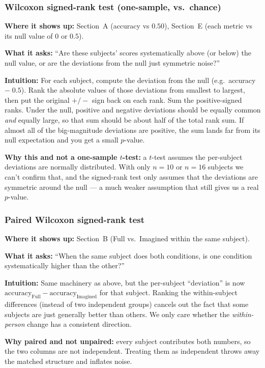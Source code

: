 \documentclass[11pt]{article}
\begin{document}
\subsubsection*{Wilcoxon signed-rank test (one-sample, vs.\ chance)}

\textbf{Where it shows up:} Section~A (accuracy vs $0.50$), Section~E (each metric vs its null value of $0$ or $0.5$).

\textbf{What it asks:} ``Are these subjects' scores systematically above (or below) the null value, or are the deviations from the null just symmetric noise?''

\textbf{Intuition:} For each subject, compute the deviation from the null (e.g.\ accuracy $-\;0.5$). Rank the absolute values of those deviations from smallest to largest, then put the original $+/-$ sign back on each rank. Sum the positive-signed ranks. Under the null, positive and negative deviations should be equally common \emph{and} equally large, so that sum should be about half of the total rank sum. If almost all of the big-magnitude deviations are positive, the sum lands far from its null expectation and you get a small $p$-value.

\textbf{Why this and not a one-sample $t$-test:} a $t$-test assumes the per-subject deviations are normally distributed. With only $n = 10$ or $n = 16$ subjects we can't confirm that, and the signed-rank test only assumes that the deviations are symmetric around the null --- a much weaker assumption that still gives us a real $p$-value.

\subsubsection*{Paired Wilcoxon signed-rank test}

\textbf{Where it shows up:} Section~B (Full vs.\ Imagined within the same subject).

\textbf{What it asks:} ``When the same subject does both conditions, is one condition systematically higher than the other?''

\textbf{Intuition:} Same machinery as above, but the per-subject ``deviation'' is now $\text{accuracy}_{\text{Full}} - \text{accuracy}_{\text{Imagined}}$ for that subject. Ranking the within-subject differences (instead of two independent groups) cancels out the fact that some subjects are just generally better than others. We only care whether the \emph{within-person} change has a consistent direction.

\textbf{Why paired and not unpaired:} every subject contributes both numbers, so the two columns are not independent. Treating them as independent throws away the matched structure and inflates noise.
\end{document}
